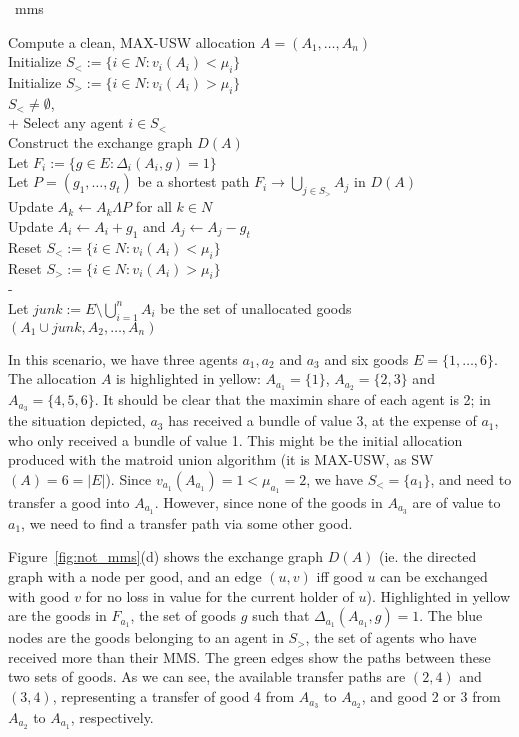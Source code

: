 \begin{algorithm}{~\cite{barman2021existence}}{mms}
\begin{pseudo}[label=\small\arabic*, indent-mark]
Compute a clean, MAX-USW allocation $A = (A_1,\dots,A_n)$ \\
Initialize $S_< := \{ i\in N : v_i(A_i) < \mu_i \}$ \\
Initialize $S_> := \{ i\in N : v_i(A_i) > \mu_i \}$ \\
 $S_<\neq\emptyset$,   \\+
    Select any agent $i \in S_<$\\
    Construct the exchange graph $D(A)$ \\
    Let $F_i := \{ g\in E : \Delta_i(A_i, g) = 1 \}$ \\
    Let $P = (g_1,\dots,g_t)$ be a shortest path $F_i \to \bigcup_{j\in S_>}A_j$ in $D(A)$ \\
    Update $A_k \leftarrow A_k\Lambda P$ for all $k\in N$ \\
    Update $A_i \leftarrow A_i + g_1$ and $A_j \leftarrow A_j - g_t$ \\
    Reset $S_< := \{ i\in N : v_i(A_i) < \mu_i \}$ \\
    Reset $S_> := \{ i\in N : v_i(A_i) > \mu_i \}$ \\-
 \\
Let $junk := E \setminus \bigcup_{i=1}^n A_i$ be the set of unallocated goods \\
 $(A_1 \cup junk, A_2,\dots,A_n)$
\end{pseudo}
  
\end{algorithm}

In this scenario, we have three agents $a_1, a_2$ and $a_3$ and six goods $E=\{1,\dots,6\}$. The allocation $A$ is highlighted in yellow: $A_{a_1} = \{1\}$, $A_{a_2} = \{2,3\}$ and $A_{a_3} = \{4,5,6\}$. It should be clear that the maximin share of each agent is 2; in the situation depicted, $a_3$ has received a bundle of value 3, at the expense of $a_1$, who only received a bundle of value 1. This might be the initial allocation produced with the matroid union algorithm (it is MAX-USW, as SW$(A) = 6 = |E|$). Since $v_{a_1}(A_{a_1}) = 1 < \mu_{a_1} = 2$, we have $S_<=\{a_1\}$, and need to transfer a good into $A_{a_1}$. However, since none of the goods in $A_{a_3}$ are of value to $a_1$, we need to find a transfer path via some other good.

Figure~\ref{fig:not_mms}(d) shows the exchange graph $D(A)$ (ie. the directed graph with a node per good, and an edge $(u,v)$ iff good $u$ can be exchanged with good $v$ for no loss in value for the current holder of $u$). Highlighted in yellow are the goods in $F_{a_1}$, the set of goods $g$ such that $\Delta_{a_1}(A_{a_1}, g) = 1$. The blue nodes are the goods belonging to an agent in $S_>$, the set of agents who have received more than their MMS. The green edges show the paths between these two sets of goods. As we can see, the available transfer paths are $(2,4)$ and $(3,4)$, representing a transfer of good 4 from $A_{a_3}$ to $A_{a_2}$, and good 2 or 3 from $A_{a_2}$ to $A_{a_1}$, respectively.

